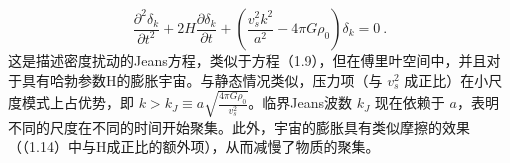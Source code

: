 \[ \frac{\partial^2 \delta_k}{\partial t^2} + 2H \frac{\partial \delta_k}{\partial t} + \left( \frac{v_s^2 k^2}{a^2} - 4\pi G\rho_0 \right) \delta_k = 0~. \]
这是描述密度扰动的Jeans方程，类似于方程（1.9），但在傅里叶空间中，并且对于具有哈勃参数H的膨胀宇宙。与静态情况类似，压力项（与 \( v_s^2 \) 成正比）在小尺度模式上占优势，即 \( k > k_J \equiv a \sqrt{\frac{4\pi G\rho_0}{v_s^2}} \)。临界Jeans波数 \( k_J \) 现在依赖于 \( a \)，表明不同的尺度在不同的时间开始聚集。此外，宇宙的膨胀具有类似摩擦的效果（（1.14）中与H成正比的额外项），从而减慢了物质的聚集。




 

